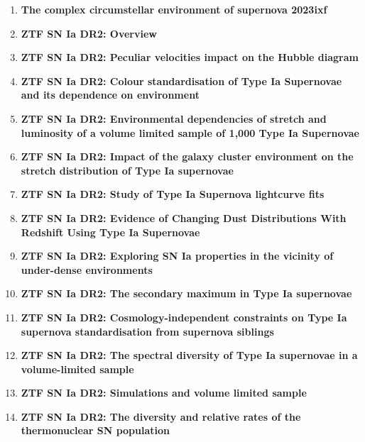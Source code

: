 \begin{singlespace}
\begin{enumerate}
\item \textbf{The complex circumstellar environment of supernova 2023ixf} \citep{2023ixf_CSM} %
\item \textbf{ZTF SN Ia DR2: Overview} \citep{DR2_Overview} %
\item \textbf{ZTF SN Ia DR2: Peculiar velocities impact on the Hubble diagram} \citep{DR2_peculiar_velocities} %
\item \textbf{ZTF SN Ia DR2: Colour standardisation of Type Ia Supernovae and its dependence on environment} \citep{DR2_colour} %
\item \textbf{ZTF SN Ia DR2: Environmental dependencies of stretch and luminosity of a volume limited sample of 1,000 Type Ia Supernovae} \citep{DR2_stretch} %
\item \textbf{ZTF SN Ia DR2: Impact of the galaxy cluster environment on the stretch distribution of Type Ia supernovae} \citep{DR2_clusters} %
\item \textbf{ZTF SN Ia DR2: Study of Type Ia Supernova lightcurve fits} \citep{DR2_lcs} %
\item \textbf{ZTF SN Ia DR2: Evidence of Changing Dust Distributions With Redshift Using Type Ia Supernovae} \citep{DR2_dust} %
\item \textbf{ZTF SN Ia DR2: Exploring SN Ia properties in the vicinity of under-dense environments} \citep{DR2_voids} %
\item \textbf{ZTF SN Ia DR2: The secondary maximum in Type Ia supernovae} \citep{DR2_2nd_max} %
\item \textbf{ZTF SN Ia DR2: Cosmology-independent constraints on Type Ia supernova standardisation from supernova siblings} \citep{DR2_siblings} %
\item \textbf{ZTF SN Ia DR2: The spectral diversity of Type Ia supernovae in a volume-limited sample} \citep{DR2_spec_div} %
\item \textbf{ZTF SN Ia DR2: Simulations and volume limited sample} \citep{DR2_sims} %
\item \textbf{ZTF SN Ia DR2: The diversity and relative rates of the thermonuclear SN population} \citep{DR2_diversity} %
\end{enumerate}




\end{singlespace}

